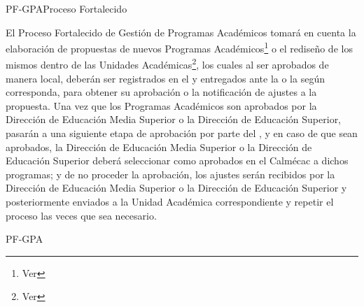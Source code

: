
\begin{Proceso}{PF-GPA}{Proceso Fortalecido}{
	    El Proceso Fortalecido de Gestión de Programas Académicos tomará en cuenta la elaboración de propuestas de nuevos Programas Académicos\footnote{Ver } o el rediseño de los mismos dentro de las Unidades Académicas\footnote{Ver }, los cuales al ser aprobados de manera local, deberán ser registrados en el  y entregados ante la  o la  según corresponda, para obtener su aprobación o la notificación de ajustes a la propuesta. Una vez que los Programas Académicos son aprobados por la Dirección de Educación Media Superior o la Dirección de Educación Superior, pasarán a una siguiente etapa de aprobación por parte del , y en caso de que sean aprobados, la Dirección de Educación Media Superior o la Dirección de Educación Superior deberá seleccionar como aprobados en el Calmécac a dichos programas; y de no proceder la aprobación, los ajustes serán recibidos por la Dirección de Educación Media Superior o la Dirección de Educación Superior y posteriormente enviados a la Unidad Académica correspondiente y repetir el proceso las veces que sea necesario.

	}{PF-GPA}



\end{Proceso}
